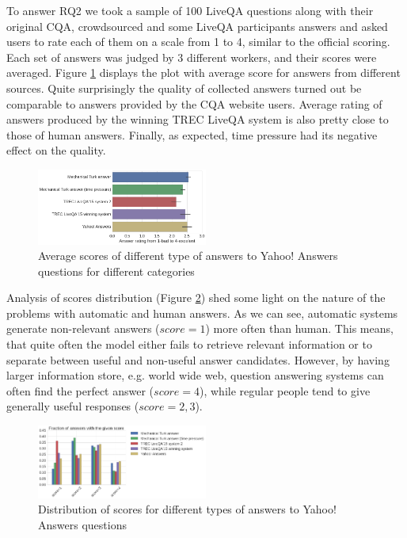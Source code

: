 \documentclass[11pt,letterpaper]{article}
\begin{document}
To answer RQ2 we took a sample of 100 LiveQA questions along with their original CQA, crowdsourced and some LiveQA participants answers and asked users to rate each of them on a scale from 1 to 4, similar to the official scoring.
Each set of answers was judged by 3 different workers, and their scores were averaged.
Figure \ref{fig:average_score} displays the plot with average score for answers from different sources.
Quite surprisingly the quality of collected answers turned out be comparable to answers provided by the CQA website users.
Average rating of answers produced by the winning TREC LiveQA system is also pretty close to those of human answers.
Finally, as expected, time pressure had its negative effect on the quality.

\begin{figure}[h]
	\centering
	\includegraphics[width=0.5\textwidth]{img/average_score}
	\caption{Average scores of different type of answers to Yahoo! Answers questions for different categories}
	\label{fig:average_score}
\end{figure}

Analysis of scores distribution (Figure \ref{fig:scores_distribution}) shed some light on the nature of the problems with automatic and human answers.
As we can see, automatic systems generate non-relevant answers ($score=1$) more often than human.
This means, that quite often the model either fails to retrieve relevant information or to separate between useful and non-useful answer candidates.
However, by having larger information store, e.g. world wide web, question answering systems can often find the perfect answer ($score=4$), while regular people tend to give generally useful responses ($score=2,3$).

\begin{figure}[h]
\centering
\includegraphics[width=0.5\textwidth]{img/scores_distribution}
\caption{Distribution of scores for different types of answers to Yahoo! Answers questions}
\label{fig:scores_distribution}
\end{figure}
\end{document}
